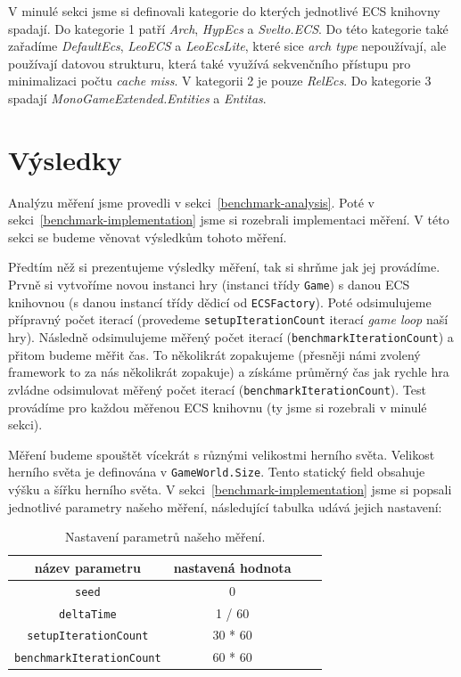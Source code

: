 V minulé sekci jsme si definovali kategorie do kterých jednotlivé ECS knihovny spadají. Do kategorie 1 patří \textit{Arch}, \textit{HypEcs} a \textit{Svelto.ECS}. Do této kategorie také zařadíme \textit{DefaultEcs}, \textit{LeoECS} a \textit{LeoEcsLite}, které sice \textit{arch type} nepoužívají, ale používají datovou strukturu, která také využívá sekvenčního přístupu pro minimalizaci počtu \textit{cache miss}. V kategorii 2 je pouze \textit{RelEcs}. Do kategorie 3 spadají \textit{MonoGameExtended.Entities} a \textit{Entitas}.

\section{Výsledky}
\label{sec:benchmark-results}
Analýzu měření jsme provedli v sekci~\ref{benchmark-analysis}. Poté v sekci~\ref{benchmark-implementation} jsme si rozebrali implementaci měření. V této sekci se budeme věnovat výsledkům tohoto měření.

Předtím něž si prezentujeme výsledky měření, tak si shrňme jak jej provádíme. Prvně si vytvoříme novou instanci hry (instanci třídy \texttt{Game}) s danou ECS knihovnou (s danou instancí třídy dědicí od \texttt{ECSFactory}). Poté odsimulujeme přípravný počet iterací (provedeme \texttt{setupIterationCount} iterací \textit{game loop} naší hry). Následně odsimulujeme měřený počet iterací (\texttt{benchmarkIterationCount}) a přitom budeme měřit čas. To několikrát zopakujeme (přesněji námi zvolený framework to za nás několikrát zopakuje) a získáme průměrný čas jak rychle hra zvládne odsimulovat měřený počet iterací (\texttt{benchmarkIterationCount}). Test provádíme pro každou měřenou ECS knihovnu (ty jsme si rozebrali v minulé sekci).

Měření budeme spouštět vícekrát s různými velikostmi herního světa. Velikost herního světa je definována v \texttt{GameWorld.Size}. Tento statický field obsahuje výšku a šířku herního světa. V sekci~\ref{benchmark-implementation} jsme si popsali jednotlivé parametry našeho měření, následující tabulka udává jejich nastavení:

\begin{table}[!htb]
    \centering\footnotesize\sf
    \begin{tabular}{c c c c}
        \toprule
        název parametru & nastavená hodnota \\
        \midrule
        \texttt{seed} & 0 \\
        \texttt{deltaTime} & 1 / 60 \\
        \texttt{setupIterationCount} & 30 * 60 \\
        \texttt{benchmarkIterationCount} & 60 * 60 \\
        \bottomrule
    \end{tabular}
    \caption{Nastavení parametrů našeho měření.}
    \label{tab:benchmark-parameters}
\end{table}

